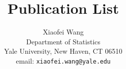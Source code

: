 \documentclass[11pt]{article}
\begin{document}
\renewcommand{\refname}{}

\title{Publication List}
\author{Xiaofei Wang\\
Department of Statistics \\ 
Yale University, New Haven, CT 06510  \\ 
email: \texttt{xiaofei.wang@yale.edu} }

\maketitle

 
\nocite{*}

\end{document}
